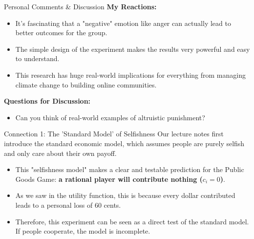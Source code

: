 \documentclass{beamer}
\begin{document}
\begin{frame}{Personal Comments \& Discussion}
    \textbf{My Reactions:}
    \begin{itemize}
        \item It's fascinating that a "negative" emotion like anger can actually lead to better outcomes for the group.
        \item The simple design of the experiment makes the results very powerful and easy to understand.
        \item This research has huge real-world implications for everything from managing climate change to building online communities.
    \end{itemize}
    \vspace{1cm}
    \textbf{Questions for Discussion:}
    \begin{itemize}
        \item Can you think of real-world examples of altruistic punishment?
    \end{itemize}
\end{frame}

\begin{frame}{Connection 1: The 'Standard Model' of Selfishness}
    Our lecture notes first introduce the standard economic model, which assumes people are purely selfish and only care about their own payoff.

    \begin{itemize}
        \item<1-> This "selfishness model" makes a clear and testable prediction for the Public Goods Game: \textbf{a rational player will contribute nothing ($c_i=0$)}.
        \pause
        \item<2-> As we saw in the utility function, this is because every dollar contributed leads to a personal loss of 60 cents.
        \pause
        \item<3-> Therefore, this experiment can be seen as a direct test of the standard model. If people cooperate, the model is incomplete.
    \end{itemize}
\end{frame}
\end{document}
